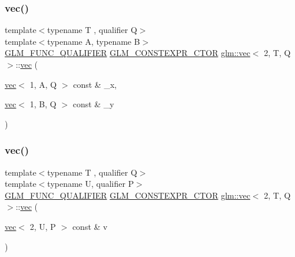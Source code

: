 \mbox{\label{structglm_1_1vec_3_012_00_01_t_00_01_q_01_4_a2801c2c65b9d873d5d5008688f7339a6}} 
\subsubsection{\texorpdfstring{vec()}{vec()}\hspace{0.1cm}{\footnotesize\ttfamily [14/17]}}
{\footnotesize\ttfamily template$<$typename T , qualifier Q$>$ \\
template$<$typename A, typename B$>$ \\
\mbox{\hyperlink{setup_8hpp_a33fdea6f91c5f834105f7415e2a64407}{G\+L\+M\+\_\+\+F\+U\+N\+C\+\_\+\+Q\+U\+A\+L\+I\+F\+I\+ER}} \mbox{\hyperlink{setup_8hpp_ad34178a09666081abdb573c14d1f4a5a}{G\+L\+M\+\_\+\+C\+O\+N\+S\+T\+E\+X\+P\+R\+\_\+\+C\+T\+OR}} \mbox{\hyperlink{structglm_1_1vec}{glm\+::vec}}$<$ 2, T, Q $>$\+::\mbox{\hyperlink{structglm_1_1vec}{vec}} (\begin{DoxyParamCaption}\item[{\mbox{\hyperlink{structglm_1_1vec}{vec}}$<$ 1, A, Q $>$ const \&}]{\+\_\+x,  }\item[{\mbox{\hyperlink{structglm_1_1vec}{vec}}$<$ 1, B, Q $>$ const \&}]{\+\_\+y }\end{DoxyParamCaption})}

\mbox{\label{structglm_1_1vec_3_012_00_01_t_00_01_q_01_4_aa42a169b552cd4f61ee71641723d2d9b}} 
\subsubsection{\texorpdfstring{vec()}{vec()}\hspace{0.1cm}{\footnotesize\ttfamily [15/17]}}
{\footnotesize\ttfamily template$<$typename T , qualifier Q$>$ \\
template$<$typename U, qualifier P$>$ \\
\mbox{\hyperlink{setup_8hpp_a33fdea6f91c5f834105f7415e2a64407}{G\+L\+M\+\_\+\+F\+U\+N\+C\+\_\+\+Q\+U\+A\+L\+I\+F\+I\+ER}} \mbox{\hyperlink{setup_8hpp_ad34178a09666081abdb573c14d1f4a5a}{G\+L\+M\+\_\+\+C\+O\+N\+S\+T\+E\+X\+P\+R\+\_\+\+C\+T\+OR}} \mbox{\hyperlink{structglm_1_1vec}{glm\+::vec}}$<$ 2, T, Q $>$\+::\mbox{\hyperlink{structglm_1_1vec}{vec}} (\begin{DoxyParamCaption}\item[{\mbox{\hyperlink{structglm_1_1vec}{vec}}$<$ 2, U, P $>$ const \&}]{v }\end{DoxyParamCaption})}

